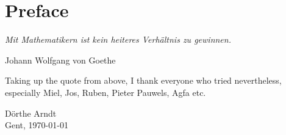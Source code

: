 \cleardoublepage

\normalsize

\chapter{Preface}
\setlength{\epigraphrule}{0pt}
\setlength{\epigraphwidth}{0.75\textwidth}
\epigraph{\textit{Mit Mathematikern ist kein heiteres Verhältnis zu gewinnen.}}{Johann Wolfgang von Goethe}

Taking up the quote from above, I thank everyone who tried nevertheless, 
especially  Miel, Jos, Ruben, Pieter Pauwels, Agfa etc.


\vspace*{\fill}

\begin{flushright}
D\"orthe Arndt \\
Gent, \today
\end{flushright}

\vspace*{\fill}



